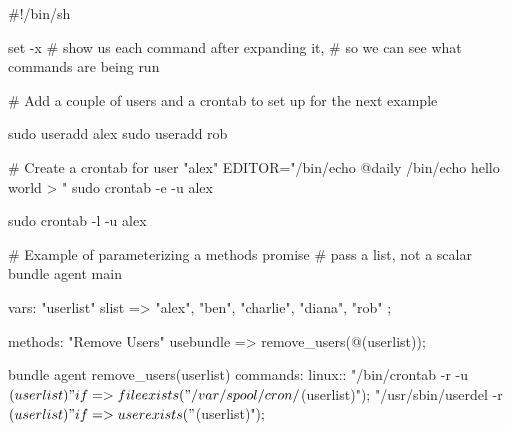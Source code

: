 \begin{codelisting}
\begin{code}
#!/bin/sh

set -x  # show us each command after expanding it,
        # so we can see what commands are being run

# Add a couple of users and a crontab to set up for the next example

sudo useradd alex
sudo useradd rob

# Create a crontab for user "alex"
EDITOR="/bin/echo @daily /bin/echo hello world > " sudo crontab -e -u alex

sudo crontab -l -u alex
\end{code}
\end{codelisting}
\begin{codelisting}
\end{codelisting}
\begin{codelisting}
\begin{code}
# Example of parameterizing a methods promise
# pass a list, not a scalar
bundle agent main
{
  vars:
      "userlist" slist => { "alex", "ben", "charlie", "diana", "rob" };

  methods:
      "Remove Users"
        usebundle => remove_users(@(userlist));
}

bundle agent remove_users(userlist)
{
  commands:
    linux::
      "/bin/crontab -r -u $(userlist)"
        if => fileexists("/var/spool/cron/$(userlist)");
      "/usr/sbin/userdel -r $(userlist)"
        if => userexists("$(userlist)");
}
\end{code}
\end{codelisting}
